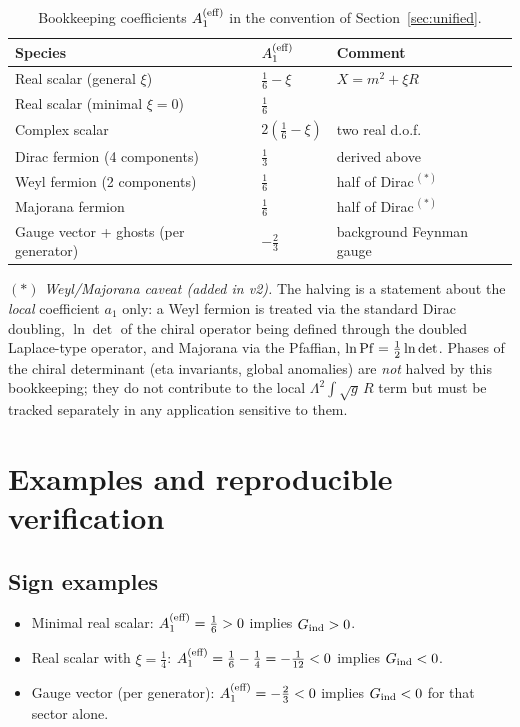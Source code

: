 \documentclass[11pt]{article}
\begin{document}
\begin{table}[h]
\centering
\caption{Bookkeeping coefficients $A_1^{\rm (eff)}$ in the convention of
Section~\ref{sec:unified}.}
\label{tab:species}
\begin{tabular}{lll}
\hline
Species & $A_1^{\rm (eff)}$ & Comment \\
\hline
Real scalar (general $\xi$) & $\frac16 - \xi$ & $X = m^2 + \xi R$ \\
Real scalar (minimal $\xi=0$) & $\frac16$ & \\
Complex scalar & $2(\frac16 - \xi)$ & two real d.o.f. \\
Dirac fermion (4 components) & $\frac13$ & derived above \\
Weyl fermion (2 components) & $\frac16$ & half of Dirac$^{\,(\ast)}$ \\
Majorana fermion & $\frac16$ & half of Dirac$^{\,(\ast)}$ \\
Gauge vector + ghosts (per generator) & $-\frac23$ & background Feynman gauge \\
\hline
\end{tabular}
\end{table}

\noindent $(\ast)$ \emph{Weyl/Majorana caveat (added in v2).} The halving is a
statement about the \emph{local} coefficient $a_1$ only: a Weyl fermion is
treated via the standard Dirac doubling, $\ln\det$ of the chiral operator
being defined through the doubled Laplace-type operator, and Majorana via the
Pfaffian, $\ln{\rm Pf} = \tfrac12 \ln\det$. Phases of the chiral determinant
(eta invariants, global anomalies) are \emph{not} halved by this bookkeeping;
they do not contribute to the local $\Lambda^2 \int\sqrt{g}\,R$ term but must
be tracked separately in any application sensitive to them.

\section{Examples and reproducible verification}

\subsection{Sign examples}
\begin{itemize}
\item Minimal real scalar: $A_1^{\rm (eff)} = \frac16 > 0$ implies
$G_{\rm ind} > 0$.
\item Real scalar with $\xi = \frac14$: $A_1^{\rm (eff)} = \frac16 - \frac14
= -\frac{1}{12} < 0$ implies $G_{\rm ind} < 0$.
\item Gauge vector (per generator): $A_1^{\rm (eff)} = -\frac23 < 0$ implies
$G_{\rm ind} < 0$ for that sector alone.
\end{itemize}
\end{document}
